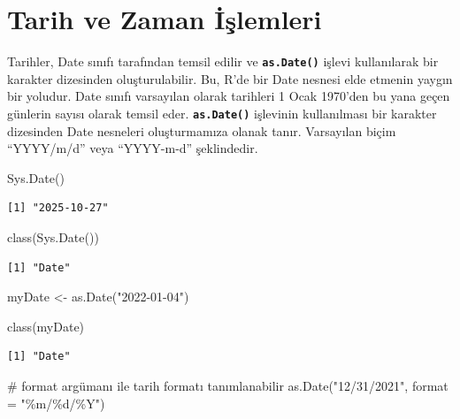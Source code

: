 \documentclass[
  letterpaper,
  DIV=11,
  numbers=noendperiod]{scrreprt}
\newenvironment{Shaded}{\begin{snugshade}}{\end{snugshade}}
\newcommand{\AttributeTok}[1]{\textcolor[rgb]{0.40,0.45,0.13}{#1}}
\newcommand{\CommentTok}[1]{\textcolor[rgb]{0.37,0.37,0.37}{#1}}
\newcommand{\FunctionTok}[1]{\textcolor[rgb]{0.28,0.35,0.67}{#1}}
\newcommand{\NormalTok}[1]{\textcolor[rgb]{0.00,0.23,0.31}{#1}}
\newcommand{\OtherTok}[1]{\textcolor[rgb]{0.00,0.23,0.31}{#1}}
\newcommand{\StringTok}[1]{\textcolor[rgb]{0.13,0.47,0.30}{#1}}
\begin{document}
\chapter{Tarih ve Zaman İşlemleri}\label{tarih-ve-zaman-iux15flemleri}

Tarihler, Date sınıfı tarafından temsil edilir ve
\textbf{\texttt{as.Date()}} işlevi kullanılarak bir karakter dizesinden
oluşturulabilir. Bu, R'de bir Date nesnesi elde etmenin yaygın bir
yoludur. Date sınıfı varsayılan olarak tarihleri 1 Ocak 1970'den bu yana
geçen günlerin sayısı olarak temsil eder. \textbf{\texttt{as.Date()}}
işlevinin kullanılması bir karakter dizesinden Date nesneleri
oluşturmamıza olanak tanır. Varsayılan biçim ``YYYY/m/d'' veya
``YYYY-m-d'' şeklindedir.

\begin{Shaded}
\begin{Highlighting}[]
\FunctionTok{Sys.Date}\NormalTok{()}
\end{Highlighting}
\end{Shaded}

\begin{verbatim}
[1] "2025-10-27"
\end{verbatim}

\begin{Shaded}
\begin{Highlighting}[]
\FunctionTok{class}\NormalTok{(}\FunctionTok{Sys.Date}\NormalTok{())}
\end{Highlighting}
\end{Shaded}

\begin{verbatim}
[1] "Date"
\end{verbatim}

\begin{Shaded}
\begin{Highlighting}[]
\NormalTok{myDate }\OtherTok{\textless{}{-}} \FunctionTok{as.Date}\NormalTok{(}\StringTok{"2022{-}01{-}04"}\NormalTok{)}

\FunctionTok{class}\NormalTok{(myDate)}
\end{Highlighting}
\end{Shaded}

\begin{verbatim}
[1] "Date"
\end{verbatim}

\begin{Shaded}
\begin{Highlighting}[]
\CommentTok{\# format argümanı ile tarih formatı tanımlanabilir}
\FunctionTok{as.Date}\NormalTok{(}\StringTok{"12/31/2021"}\NormalTok{, }\AttributeTok{format =} \StringTok{"\%m/\%d/\%Y"}\NormalTok{)}
\end{Highlighting}
\end{Shaded}
\end{document}

